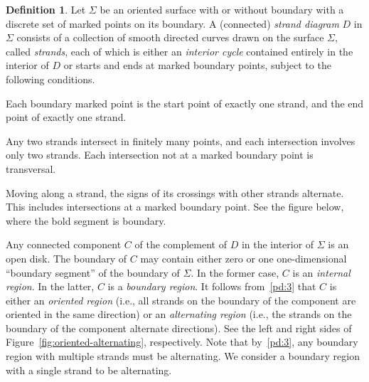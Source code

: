 \documentclass{article}
\theoremstyle{definition}
\newtheorem{defn}[thm]{Definition}
\begin{document}
\begin{defn}\label{defn:postnikov-diagram}
	Let $\Sigma$ be an oriented surface with or without boundary with a discrete set of marked points on its boundary. A (connected) \textit{strand diagram} $D$ in $\Sigma$ consists of a collection of smooth directed curves drawn on the surface $\Sigma$, called \textit{strands}, each of which is either an \textit{interior cycle}
	 contained entirely in the interior of $D$ or starts and ends at marked boundary points, subject to the following conditions.
    \begin{enumerate}
        {\item Each boundary marked point is the start point of exactly one strand, and the end point of exactly one strand.\label{pd:1}}
        {\item Any two strands intersect in finitely many points, and each intersection involves only two strands. Each intersection not at a marked boundary point is transversal.\label{pd:2}}
	{\item\label{pd:3} Moving along a strand, the signs of its crossings with other strands alternate. This includes intersections at a marked boundary point. See the figure below, where the bold segment is boundary. 
		\def\svgwidth{60pt}
		\begin{figure}[H]			\centering
			
\label{fig:alternating-strands}

		\end{figure}}
	{\item\label{dpd:4} 
		    Any connected component $C$ of the complement of $D$ in the interior of $\Sigma$ is an open disk. The boundary of $C$ may contain either zero or one one-dimensional ``boundary segment'' of the boundary of $\Sigma$. In the former case, $C$ is an \textit{internal region}. In the latter, $C$ is a \textit{boundary region}. 
It follows from~\eqref{pd:3} that $C$ is either an \textit{oriented region} (i.e., all strands on the boundary of the component are oriented in the same direction) or an \textit{alternating region} (i.e., the strands on the boundary of the component alternate directions). See the left and right sides of Figure~\ref{fig:oriented-alternating}, respectively.
Note that by~\eqref{pd:3}, any boundary region with multiple strands must be alternating. We consider a boundary region with a single strand to be alternating.




}
\end{enumerate}
\end{defn}
\end{document}
